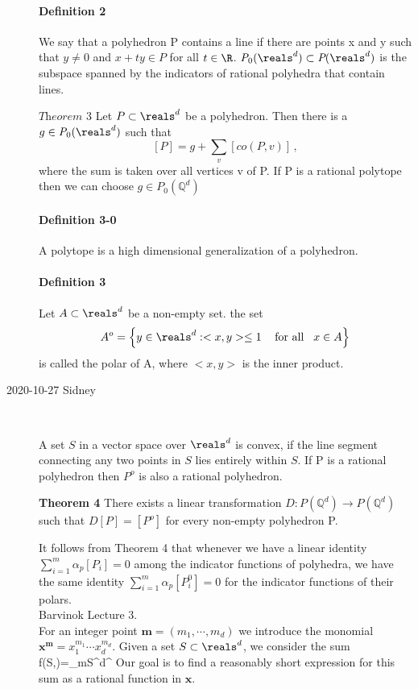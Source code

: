 \begin{description}
\paragraph{Definition  2}
We say that a polyhedron P contains a line if there are points x and y
such that $y\neq 0$ and $x+ty\in P$ for all $t\in\R$.
$\textit{P}_0(\reals^d)\subset\textit{P}(\reals^d)$ is the subspace
spanned by the indicators of rational polyhedra that contain lines.

$\textit{Theorem 3}$
Let $P\subset\reals^d$ be a polyhedron. Then there is a
$g\in\textit{P}_0(\reals^d)$ such that
$$
[P]=g+\sum_v[co(P,v)]
\,,
$$
where the sum is taken over all vertices v of P. If P is a rational
polytope then we can choose $g\in\textit{P}_0(\mathbb{Q}^d)$

\paragraph{Definition 3-0}
A polytope is a high dimensional generalization of a polyhedron.

\paragraph{Definition  3} Let $A\subset\reals^d$ be a non-empty set. the set
$$
A^o=\left\lbrace y\in\reals^d:<x,y>\leq 1
  \hspace{3mm}\mbox{ for all}\hspace{3mm}x\in A\right\rbrace
$$
is called the polar of A, where $<x,y>$ is the inner product.

\item[2020-10-27 Sidney]~

A set $S$ in a vector space over $\reals^d$ is convex, if the line segment
connecting any two points in $S$ lies entirely within $S$. If P is a
rational polyhedron then $P^o$ is also a rational polyhedron.

\textbf{Theorem 4}
There exists a linear transformation
$\textit{D}:\textit{P}(\mathbb{Q}^d)\rightarrow\textit{P}(\mathbb{Q}^d)$ such that
$\textit{D}[P]=[P^o]$ for every non-empty polyhedron P.

It follows from Theorem 4 that whenever we have a linear identity
$\sum^m_{i=1}\alpha_p[P_i]=0$ among the indicator functions of polyhedra,
we have the same identity $\sum^m_{i=1}\alpha_p[P_i^0]=0$ for the
indicator functions of their polars.
\\

Barvinok Lecture 3.
\\
For an integer point $\mathbf{m}=(m_1,\cdots ,m_d)$ we introduce the monomial
$\mathbf{x}^\mathbf{m}=x_1^{m_1}\cdots x_d^{m_d}$. Given a set $S\subset
\reals^d$, we consider the sum
\beq
f(S,)=\sum_{m\in S\cap\integers^d}^
Our goal is to find a reasonably short expression for this sum as a
rational function in $\mathbf{x}$.


\end{description}
